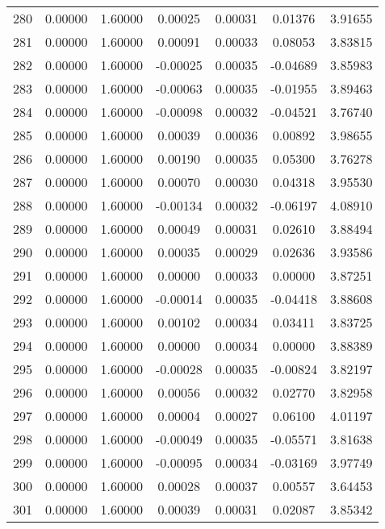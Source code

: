 \begin{longtable}{c c c c c c c}
280 &  0.00000 &      1.60000 &  0.00025 &   0.00031 &   0.01376 &   3.91655 \\
281 &  0.00000 &      1.60000 &  0.00091 &   0.00033 &   0.08053 &   3.83815 \\
282 &  0.00000 &      1.60000 & -0.00025 &   0.00035 &  -0.04689 &   3.85983 \\
283 &  0.00000 &      1.60000 & -0.00063 &   0.00035 &  -0.01955 &   3.89463 \\
284 &  0.00000 &      1.60000 & -0.00098 &   0.00032 &  -0.04521 &   3.76740 \\
285 &  0.00000 &      1.60000 &  0.00039 &   0.00036 &   0.00892 &   3.98655 \\
286 &  0.00000 &      1.60000 &  0.00190 &   0.00035 &   0.05300 &   3.76278 \\
287 &  0.00000 &      1.60000 &  0.00070 &   0.00030 &   0.04318 &   3.95530 \\
288 &  0.00000 &      1.60000 & -0.00134 &   0.00032 &  -0.06197 &   4.08910 \\
289 &  0.00000 &      1.60000 &  0.00049 &   0.00031 &   0.02610 &   3.88494 \\
290 &  0.00000 &      1.60000 &  0.00035 &   0.00029 &   0.02636 &   3.93586 \\
291 &  0.00000 &      1.60000 &  0.00000 &   0.00033 &   0.00000 &   3.87251 \\
292 &  0.00000 &      1.60000 & -0.00014 &   0.00035 &  -0.04418 &   3.88608 \\
293 &  0.00000 &      1.60000 &  0.00102 &   0.00034 &   0.03411 &   3.83725 \\
294 &  0.00000 &      1.60000 &  0.00000 &   0.00034 &   0.00000 &   3.88389 \\
295 &  0.00000 &      1.60000 & -0.00028 &   0.00035 &  -0.00824 &   3.82197 \\
296 &  0.00000 &      1.60000 &  0.00056 &   0.00032 &   0.02770 &   3.82958 \\
297 &  0.00000 &      1.60000 &  0.00004 &   0.00027 &   0.06100 &   4.01197 \\
298 &  0.00000 &      1.60000 & -0.00049 &   0.00035 &  -0.05571 &   3.81638 \\
299 &  0.00000 &      1.60000 & -0.00095 &   0.00034 &  -0.03169 &   3.97749 \\
300 &  0.00000 &      1.60000 &  0.00028 &   0.00037 &   0.00557 &   3.64453 \\
301 &  0.00000 &      1.60000 &  0.00039 &   0.00031 &   0.02087 &   3.85342 \\

\end{longtable}

